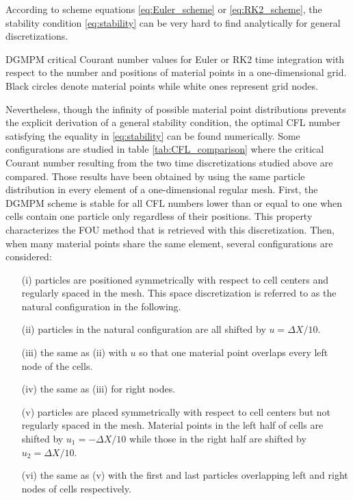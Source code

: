 According to scheme equations \eqref{eq:Euler_scheme} or \eqref{eq:RK2_scheme}, the stability condition \eqref{eq:stability} can be very hard to find analytically for general discretizations. 
\begin{table}[h]
  \centering
  
  \caption{DGMPM critical Courant number values for Euler or RK2 time integration with respect to the number and positions of material points in a one-dimensional grid. Black circles denote material points while white ones represent grid nodes.}
  \label{tab:CFL_comparison}
\end{table}
Nevertheless, though the infinity of possible material point distributions prevents the explicit derivation of a general stability condition, the optimal CFL number satisfying the equality in \eqref{eq:stability} can be found numerically. Some configurations are studied in table \ref{tab:CFL_comparison} where the critical Courant number resulting from the two time discretizations studied above are compared. Those results have been obtained by using the same particle distribution in every element of a one-dimensional regular mesh. 
First, the DGMPM scheme is stable for all CFL numbers lower than or equal to one when cells contain one particle only regardless of their positions.
This property characterizes the FOU method that is retrieved with this discretization. 
Then, when many material points share the same element, several configurations are considered:
\begin{itemize}
\item[(i)] particles are positioned symmetrically with respect to cell centers and regularly spaced in the mesh.
  This space discretization is referred to as the natural configuration in the following.
\item[(ii)] particles in the natural configuration are all shifted by $u=\Delta X/10$.
\item[(iii)] the same as (ii) with $u$ so that one material point overlaps every left node of the cells.
\item[(iv)] the same as (iii) for right nodes.
\item[(v)] particles are placed symmetrically with respect to cell centers but not regularly spaced in the mesh. Material points in the left half of cells are shifted by $u_1=-\Delta X/10$ while those in the right half are shifted by $u_2=\Delta X/10$.
\item[(vi)] the same as (v) with the first and last particles overlapping left and right nodes of cells respectively.
\end{itemize}
